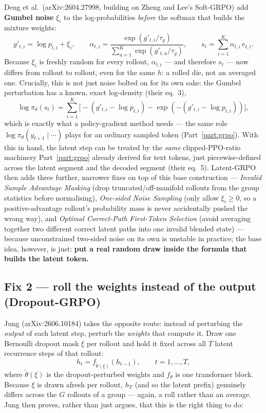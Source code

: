 \documentclass[11pt]{article}
\theoremstyle{definition}
\begin{document}
Deng et al.\ (arXiv:2604.27998, building on Zheng and Lee's Soft-GRPO) add \textbf{Gumbel noise} $\xi_i$ to the log-probabilities \emph{before} the softmax that builds the mixture weights:
\[
g'_{t,i} = \log p_{t,i} + \xi_i,
\qquad
\alpha_{t,i} = \frac{\exp(g'_{t,i}/\tau_g)}{\sum_{u=1}^K \exp(g'_{t,u}/\tau_g)},
\qquad
s_t = \sum_{i=1}^K \alpha_{t,i}\, e_{t,i}.
\tag{10.2}
\]
Because $\xi_i$ is freshly random for every rollout, $\alpha_{t,i}$ --- and therefore $s_t$ --- now differs from rollout to rollout, even for the same $h$: a rolled die, not an averaged one. Crucially, this is not just noise bolted on for its own sake: the Gumbel perturbation has a known, exact log-density (their eq.~3),
\[
\log \pi_\theta(s_t) = \sum_{i=1}^K \Big[-(g'_{t,i}-\log p_{t,i}) - \exp(-(g'_{t,i}-\log p_{t,i}))\Big],
\]
which is exactly what a policy-gradient method needs --- the same role $\log\pi_\theta(y_{t+1}\mid\cdots)$ plays for an ordinary sampled token (Part~\ref{part:grpo}). With this in hand, the latent step can be treated by the \emph{same} clipped-PPO-ratio machinery Part~\ref{part:grpo} already derived for text tokens, just piecewise-defined across the latent segment and the decoded segment (their eq.~5). Latent-GRPO then adds three further, narrower fixes on top of this base construction --- \emph{Invalid Sample Advantage Masking} (drop truncated/off-manifold rollouts from the group statistics before normalising), \emph{One-sided Noise Sampling} (only allow $\xi_i \ge 0$, so a positive-advantage rollout's probability mass is never accidentally pushed the wrong way), and \emph{Optimal Correct-Path First-Token Selection} (avoid averaging together two different correct latent paths into one invalid blended state) --- because unconstrained two-sided noise on its own is unstable in practice; the base idea, however, is just: \textbf{put a real random draw inside the formula that builds the latent token.}

\subsection{Fix 2 --- roll the weights instead of the output (Dropout-GRPO)}

Jung (arXiv:2606.10184) takes the opposite route: instead of perturbing the \emph{output} of each latent step, perturb the \emph{weights} that compute it. Draw one Bernoulli dropout mask $\xi$ per rollout and hold it fixed across all $T$ latent recurrence steps of that rollout:
\[
h_t = f_{\tilde\theta(\xi)}(h_{t-1}),\qquad t=1,\dots,T,
\tag{10.3}
\]
where $\tilde\theta(\xi)$ is the dropout-perturbed weights and $f_\theta$ is one transformer block. Because $\xi$ is drawn afresh per rollout, $h_T$ (and so the latent prefix) genuinely differs across the $G$ rollouts of a group --- again, a roll rather than an average. Jung then proves, rather than just argues, that this is the right thing to do:
\end{document}
